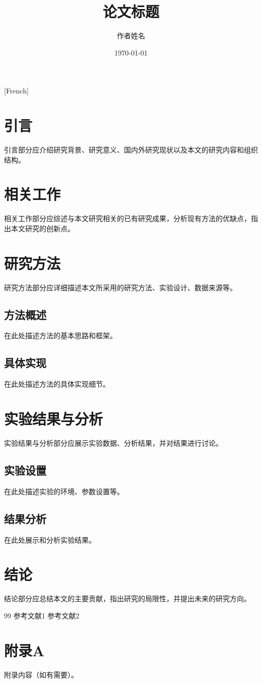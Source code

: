 [French] \documentclass[12pt,a4paper,twocolumn]{article}
\title{论文标题}
\author{作者姓名}
\date{\today}
\begin{document}

\section{引言}
引言部分应介绍研究背景、研究意义、国内外研究现状以及本文的研究内容和组织结构。

\section{相关工作}
相关工作部分应综述与本文研究相关的已有研究成果，分析现有方法的优缺点，指出本文研究的创新点。

\section{研究方法}
研究方法部分应详细描述本文所采用的研究方法、实验设计、数据来源等。

\subsection{方法概述}
在此处描述方法的基本思路和框架。

\subsection{具体实现}
在此处描述方法的具体实现细节。

\section{实验结果与分析}
实验结果与分析部分应展示实验数据、分析结果，并对结果进行讨论。

\subsection{实验设置}
在此处描述实验的环境、参数设置等。

\subsection{结果分析}
在此处展示和分析实验结果。

\section{结论}
结论部分应总结本文的主要贡献，指出研究的局限性，并提出未来的研究方向。

\begin{thebibliography}{99}
 参考文献1
 参考文献2
\end{thebibliography}

\appendix
\section{附录A}
附录内容（如有需要）。
\end{document}
